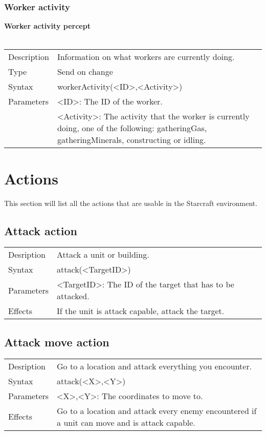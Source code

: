 \documentclass[english,11pt]{report}
\begin{document}
\subsection{Worker activity}
\textbf{Worker activity percept}\\
\\
\begin{tabularx}{\textwidth}{lX}
 Description & Information on what workers are currently doing. \\
 Type & Send on change \\
 Syntax & workerActivity(<ID>,<Activity>) \\
 Parameters &   <ID>: The ID of the worker.\\
            &   <Activity>: The activity that the worker is currently doing, one of the following: gatheringGas, gatheringMinerals, constructing or idling.
\end{tabularx}

\chapter{Actions}
This section will list all the actions that are usable in the Starcraft environment.

\section{Attack action}
\begin{tabularx}{\textwidth}{lX}
 Desription & Attack a unit or building. \\
 Syntax & attack(<TargetID>) \\
 Parameters & <TargetID>: The ID of the target that has to be attacked.\\
 Effects &  If the unit is attack capable, attack the target.
\end{tabularx}

\section{Attack move action}
\begin{tabularx}{\textwidth}{lX}
 Desription & Go to a location and attack everything you encounter. \\
 Syntax & attack(<X>,<Y>) \\
 Parameters & <X>,<Y>: The coordinates to move to.\\
 Effects &  Go to a location and attack every enemy encountered if a unit can move and is attack capable.
\end{tabularx}
\end{document}
